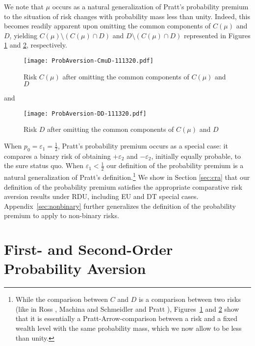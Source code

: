 \documentclass[11pt]{article}
\begin{document}
We note that $\mu$ 
occurs as a natural generalization of Pratt's \cite{P64} probability 
premium
to the situation of risk changes with probability mass less than unity.
Indeed, this becomes readily apparent upon omitting the common components of $C(\mu)$ and $D$,
yielding $C(\mu)\setminus \left(C(\mu)\cap D\right)$
and $D\setminus \left(C(\mu)\cap D\right)$ represented in Figures \ref{fig:CmuD} and \ref{fig:DD}, respectively.
\vskip -0.5cm
\begin{figure}[H]
\begin{center}
\caption{Risk $C(\mu)$ after omitting the common components of $C(\mu)$ and $D$
}
\vskip 0.4cm
\texttt{[image: ProbAversion-CmuD-111320.pdf]}
\label{fig:CmuD}
\end{center}
\end{figure}
\noindent
and
\vskip -0.5cm
\begin{figure}[H]
\begin{center}
\caption{Risk $D$ after omitting the common components of $C(\mu)$ and $D$
}
\vskip 0.4cm
\texttt{[image: ProbAversion-DD-111320.pdf]}
\label{fig:DD}
\end{center}
\end{figure}
\noindent When $p_{0}=\varepsilon_{1}=\tfrac{1}{2}$, Pratt's \cite{P64} probability premium occurs as a special case:
it compares a binary risk of obtaining $+\varepsilon_{2}$ and $-\varepsilon_{2}$, initially equally probable,
to the sure status quo.
When $\varepsilon_{1}<\tfrac{1}{2}$ our definition of the probability premium
is a natural generalization of Pratt's definition.\footnote{While the comparison between $C$ and $D$ is a comparison between
two risks (like in Ross \cite{R81}, Machina and Schmeidler \cite{MS89} and Pratt \cite{P90}),
Figures~\ref{fig:CmuD} and \ref{fig:DD} show that it is essentially a Pratt-Arrow-comparison
between a risk and a fixed wealth level with the same probability mass,
which we now allow to be less than unity.}
We show in Section \ref{sec:cra} that our definition of the probability premium satisfies
the appropriate comparative risk aversion results under RDU,
including EU and DT special cases.
Appendix~\ref{sec:nonbinary} further generalizes the definition of the probability premium to apply to non-binary risks.


\setcounter{equation}{0}

\section{First- and Second-Order Probability Aversion}\label{sec:probaversion}
\end{document}
